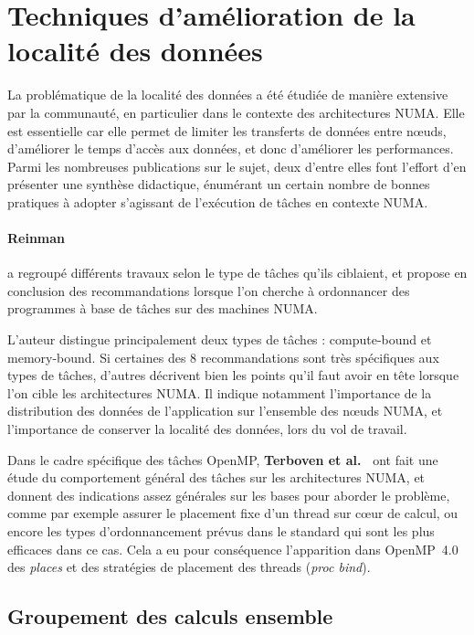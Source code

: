 \section{Techniques d'amélioration de la localité des données}\label{sec:rw:numa}


La problématique de la localité des données a été étudiée de manière extensive par la communauté, en particulier dans le contexte des architectures NUMA.
Elle est essentielle car elle permet de limiter les transferts de données entre nœuds, d'améliorer le temps d'accès aux données, et donc d'améliorer les performances.
Parmi les nombreuses publications sur le sujet, deux d'entre elles font l'effort d'en présenter une synthèse didactique, énumérant un certain nombre de bonnes pratiques à adopter s'agissant de l'exécution de tâches en contexte NUMA.

\paragraph{Reinman~\cite{Reinman2015}} a regroupé différents travaux selon le type de tâches qu'ils ciblaient, et propose en conclusion des recommandations lorsque l'on cherche à ordonnancer des programmes à base de tâches sur des machines NUMA.

L'auteur distingue principalement deux types de tâches : compute-bound et memory-bound.
Si certaines des 8 recommandations sont très spécifiques aux types de tâches, d'autres décrivent bien les points qu'il faut avoir en tête lorsque l'on cible les architectures NUMA.
Il indique notamment l'importance de la distribution des données de l'application sur l'ensemble des nœuds NUMA, et l'importance de conserver la localité des données, lors du vol de travail.

Dans le cadre spécifique des tâches OpenMP, \textbf{Terboven et al.~\cite{Terboven2012}} ont fait une étude du comportement général des tâches sur les architectures NUMA, et donnent des indications assez générales sur les bases pour aborder le problème, comme par exemple assurer le placement fixe d'un thread sur cœur de calcul, ou encore les types d'ordonnancement prévus dans le standard qui sont les plus efficaces dans ce cas.
Cela a eu pour conséquence l'apparition dans OpenMP~4.0 des \emph{places} et des stratégies de placement des threads (\emph{proc bind}).



\subsection{Groupement des calculs ensemble}

